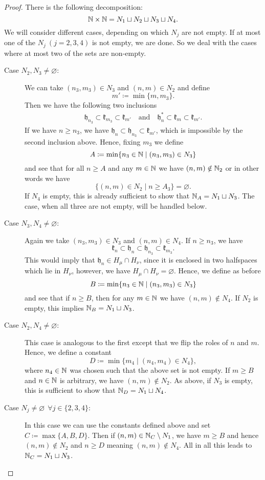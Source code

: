 \begin{proof}
  There is the following decomposition:
  \[
    \mathbb{N} \times \mathbb{N} = N_1 \sqcup N_2 \sqcup N_3 \sqcup N_4.
  \] 
  We will consider different cases, depending on which \(N_j\) are not empty. If at most one of the \(N_j\ (j = 2,3,4)\)  is not empty, we are done. So we deal with the cases where at most two of the sets are non-empty.
  \begin{description}
  \item[Case \(N_2, N_3 \neq \varnothing\):] We can take \((n_3, m_3) \in N_3\) and \((n,m) \in N_2\) and define
    \[
      m' \coloneqq \min\{m, m_3\}.
    \]
    Then we have the following two inclusions
    \begin{align*}
      \mathfrak{h}_{n_3} \subset \mathfrak{k}_{m_3} \subset \mathfrak{k}_{m'} \quad \text{and}\quad \mathfrak{h}_{n}^\ast \subset \mathfrak{k}_m \subset \mathfrak{k}_{m'}.
    \end{align*}
    If we have \(n \geq n_3\), we have \(\mathfrak{h}_n \subset \mathfrak{h}_{n_3} \subset \mathfrak{k}_{m'}\), which is impossible by the second inclusion above. Hence, fixing \(m_3\) we define
    \[
      A \coloneqq \min \{n_3 \in \mathbb{N} \mid (n_3, m_3) \in N_3\}
    \]
    and see that for all \(n \geq A\) and any \(m \in \mathbb{N}\) we have \((n,m) \notin \mathbb{N}_2\) or in other words we have
    \[
      \{(n,m) \in N_2 \mid n \geq A_3\} = \varnothing.
    \]
    If \(N_4\) is empty, this is already sufficient to show that \(\mathbb{N}_A = N_1 \sqcup N_3\). The case, when all three are not empty, will be handled below.
  \item[Case \(N_3,N_4 \neq \varnothing\):] Again we take \((n_3, m_3) \in N_3\) and \((n,m) \in N_4\). If \(n \geq n_3\), we have
    \[
      \mathfrak{k}_n \subset \mathfrak{h}_n \subset \mathfrak{h}_{n_3} \subset \mathfrak{k}_{m_3}.
    \]
    This would imply that \(\mathfrak{h}_n \in H_\mu \cap H_\nu\), since it is enclosed in two halfspaces which lie in \(H_\nu\), however, we have \(H_\mu \cap H_\nu = \varnothing\). Hence, we define as before
    \[
      B \coloneqq \min \{n_3 \in \mathbb{N} \mid (n_3, m_3) \in N_3\}
    \]
    and see that if \(n \geq B\), then for any \(m \in \mathbb{N}\) we have \((n,m) \notin N_4\). If \(N_2\) is empty, this implies \(\mathbb{N}_B = N_1 \sqcup N_3\).
  \item[Case \(N_2,N_4 \neq \varnothing\):] This case is analogous to the first except that we flip the roles of \(n\) and \(m\). Hence, we define a constant
    \[
      D \coloneqq \min \{m_4 \mid (n_4, m_4) \in N_4\},
    \]
    where \(n_4 \in \mathbb{N}\) was chosen such that the above set is not empty. If \(m \geq B\) and \(n \in \mathbb{N}\) is arbitrary, we have \((n, m) \notin N_2\). As above, if \(N_3 \) is empty, this is sufficient to show that \(\mathbb{N}_D = N_1 \sqcup N_4\).
  \item[Case \(N_j \neq \varnothing\ \ \forall j \in\{2,3,4\}\):] In this case we can use the constants defined above and set \(C \coloneqq \max \{A,B,D\}\). Then if \((n,m) \in \mathbb{N}_C \setminus N_1\), we have \(m \geq B\) and hence \((n,m) \notin N_2\) and \(n \geq D\) meaning \((n,m) \notin N_4\). All in all this leads to \(\mathbb{N}_C = N_1 \sqcup N_3\).
  \end{description}
\end{proof}

